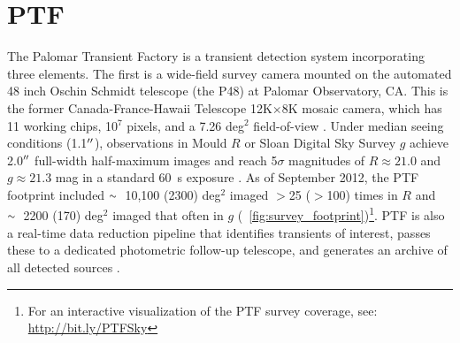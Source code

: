 \documentclass[iop]{emulateapj}
\newcommand{\apwsim}{\raisebox{0.2ex}{\scriptsize$\sim$\normalsize}}
\begin{document}

\section{PTF } %
The Palomar Transient Factory is a transient detection system incorporating three elements. The first is a wide-field survey camera mounted on the automated 48 inch Oschin Schmidt telescope (the P48) at Palomar Observatory, CA. This is the former Canada-France-Hawaii Telescope 12K$\times$8K mosaic camera, which has 11 working chips, 10$^7$ pixels, and a 7.26 deg$^2$ field-of-view \citep{rahmer2008}. Under median seeing conditions (1.1$\mbox{$^{\prime\prime}$}$), observations in Mould $R$ or Sloan Digital Sky Survey \citep[SDSS;][]{york00} $g$ achieve 2.0$\mbox{$^{\prime\prime}$}$ full-width half-maximum images and reach 5$\sigma$ magnitudes of $R \approx 21.0$ and $g \approx 21.3$ mag in a standard 60~s exposure \citep{nick2010}. As of September 2012, the PTF footprint included $\apwsim$10,100 (2300) deg$^2$ imaged $>$25 ($>$100) times in $R$ and $\apwsim$2200 (170) deg$^2$ imaged that often in $g$ (\figurename~\ref{fig:survey_footprint})\footnote{For an interactive visualization of the PTF survey coverage, see: \url{http://bit.ly/PTFSky}}. PTF is also a real-time data reduction pipeline that identifies transients of interest, passes these to a dedicated photometric follow-up telescope, and generates an archive of all detected sources \citep{nick2009,rau2009}. %
\end{document}
